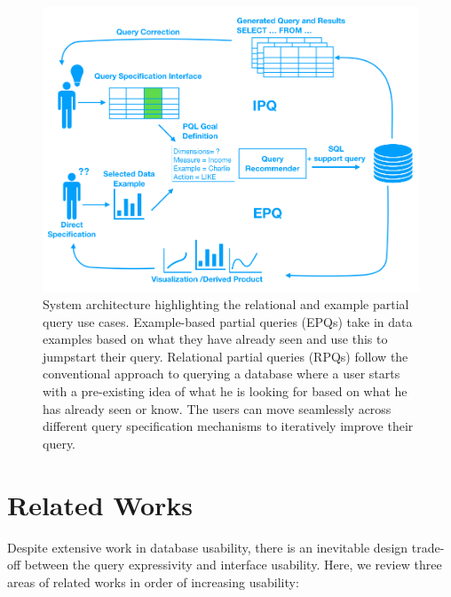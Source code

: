 \documentclass{sig-alternate-05-2015}
\begin{document}
\begin{figure}[ht!]\label{system}
\includegraphics[width=\linewidth]{figures/system.png}
\caption{System architecture highlighting the relational and example partial query use cases. Example-based partial queries (EPQs) take in data examples based on what they have already seen and use this to jumpstart their query. Relational partial queries (RPQs) follow the conventional approach to querying a database where a user starts with a pre-existing idea of what he is looking for based on what he has already seen or know.  The users can move seamlessly across different query specification mechanisms to iteratively improve their query.}
\end{figure}
\section{Related Works}
\par Despite extensive work in database usability, there is an inevitable design trade-off between the query expressivity and interface usability\cite{Jagadish2007,Morton2014}. Here, we review three areas of related works in order of increasing usability: 
\end{document}
